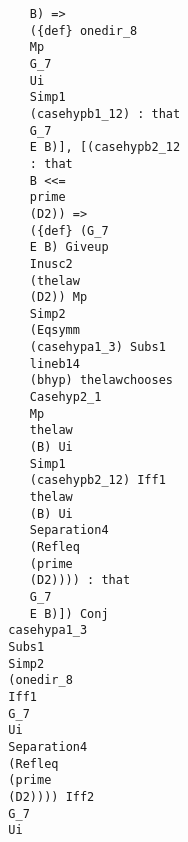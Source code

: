 \documentclass[12pt]{article}
\begin{document}
\begin{verbatim}
                                           B) => 
                                           ({def} onedir_8 
                                           Mp 
                                           G_7 
                                           Ui 
                                           Simp1 
                                           (casehypb1_12) : that 
                                           G_7 
                                           E B)], [(casehypb2_12 
                                           : that 
                                           B <<= 
                                           prime 
                                           (D2)) => 
                                           ({def} (G_7 
                                           E B) Giveup 
                                           Inusc2 
                                           (thelaw 
                                           (D2)) Mp 
                                           Simp2 
                                           (Eqsymm 
                                           (casehypa1_3) Subs1 
                                           lineb14 
                                           (bhyp) thelawchooses 
                                           Casehyp2_1 
                                           Mp 
                                           thelaw 
                                           (B) Ui 
                                           Simp1 
                                           (casehypb2_12) Iff1 
                                           thelaw 
                                           (B) Ui 
                                           Separation4 
                                           (Refleq 
                                           (prime 
                                           (D2)))) : that 
                                           G_7 
                                           E B)]) Conj 
                                        casehypa1_3 
                                        Subs1 
                                        Simp2 
                                        (onedir_8 
                                        Iff1 
                                        G_7 
                                        Ui 
                                        Separation4 
                                        (Refleq 
                                        (prime 
                                        (D2)))) Iff2 
                                        G_7 
                                        Ui 

\end{verbatim}
\end{document}
